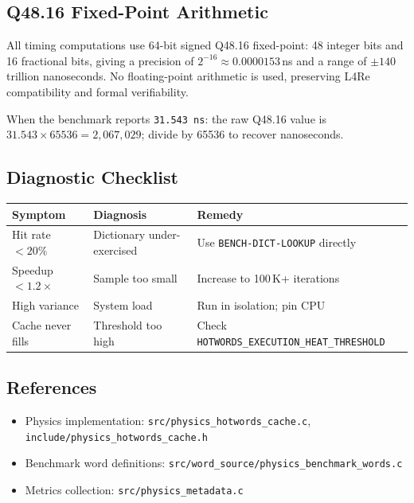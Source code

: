 \subsection{Q48.16 Fixed-Point Arithmetic}

All timing computations use 64-bit signed Q48.16 fixed-point:
48 integer bits and 16 fractional bits, giving a precision of
$2^{-16} \approx 0.0000153$\,ns and a range of $\pm 140$ trillion
nanoseconds. No floating-point arithmetic is used, preserving L4Re
compatibility and formal verifiability.

When the benchmark reports \texttt{31.543 ns}: the raw Q48.16 value is
$31.543 \times 65536 = 2{,}067{,}029$; divide by 65536 to recover
nanoseconds.

\subsection{Diagnostic Checklist}

\begin{center}
\begin{tabular}{lll}
\toprule
Symptom & Diagnosis & Remedy \\
\midrule
Hit rate $< 20\%$ & Dictionary under-exercised & Use \texttt{BENCH-DICT-LOOKUP} directly \\
Speedup $< 1.2\times$ & Sample too small & Increase to 100\,K+ iterations \\
High variance & System load & Run in isolation; pin CPU \\
Cache never fills & Threshold too high & Check \texttt{HOTWORDS\_EXECUTION\_HEAT\_THRESHOLD} \\
\bottomrule
\end{tabular}
\end{center}

\subsection{References}

\begin{itemize}
  \item Physics implementation: \texttt{src/physics\_hotwords\_cache.c},
        \texttt{include/physics\_hotwords\_cache.h}
  \item Benchmark word definitions:
        \texttt{src/word\_source/physics\_benchmark\_words.c}
  \item Metrics collection: \texttt{src/physics\_metadata.c}
\end{itemize}
